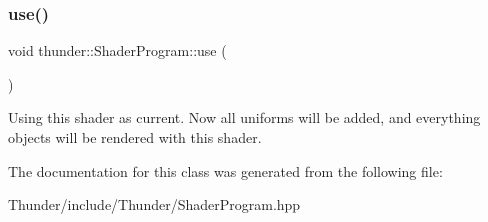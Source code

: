 \subsubsection{\texorpdfstring{use()}{use()}}
{\footnotesize\ttfamily void thunder\+::\+Shader\+Program\+::use (\begin{DoxyParamCaption}{ }\end{DoxyParamCaption})}

Using this shader as current. Now all uniforms will be added, and everything objects will be rendered with this shader. 

The documentation for this class was generated from the following file\+:\begin{DoxyCompactItemize}
\item 
Thunder/include/\+Thunder/Shader\+Program.\+hpp\end{DoxyCompactItemize}
